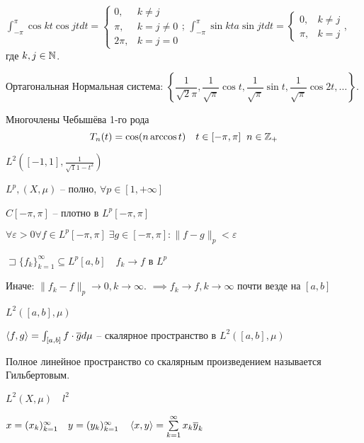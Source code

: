 $\int_{-\pi}^\pi \cos k t \cos jt dt = \begin{cases}
    0, & k\neq j\\
    \pi, & k = j \neq 0\\
    2\pi, & k =j = 0
\end{cases}$; $\int_{-\pi}^\pi \sin k t a\sin j t dt = \begin{cases}
    0, & k\neq j\\
    \pi, & k = j
\end{cases}$, где $k, j \in \mathbb{N}$.

Ортагональная Нормальная система: $\left\{ \dfrac{1}{\sqrt{2}\pi}, \dfrac{1}{\sqrt{\pi}}\cos t, \dfrac{1}{\sqrt{\pi}}\sin t,
\dfrac{1}{\sqrt{\pi}} \cos 2t, \dots
\right\}$.
\begin{definition}
    Многочлены Чебышёва 1-го рода
    \[T_n(t) = \cos(n \arccos t)\quad t\in [-\pi, \pi]\;\; n\in \mathbb{Z}_+\]

    $L^2([-1,1], \frac{1}{\sqrt{1}{1 - t^2}})$
\end{definition}

\begin{note}
    $L^p, (X, \mu)$ -- полно, $\forall p \in [1, +\infty ]$

    $C[-\pi, \pi]$ -- плотно в $L^p[-\pi, \pi]$

    $\forall \varepsilon >0 \forall f\in L^p[-\pi, \pi]\; \exists g\in [-\pi, \pi]: \|f - g\|_p <\varepsilon$
\end{note}

\begin{note}
    $\sqsupset \{f_k\}_{k=1}^{\infty } \subseteq L^p[a,b]\quad f_k \to f$ в $L^p$

    Иначе: $\|f_k - f\|_p \to 0, k\to \infty$. $\implies f_k \to f, k\to \infty $ почти везде на $[a,b]$
\end{note}

\begin{note}
    $L^2\left( [a,b], \mu \right) $

    $\left<f, g \right> = \int_{[a,b]}f \cdot \overline{g} d\mu$ -- скалярное пространство в $L^2([a,b], \mu)$
\end{note}

\begin{definition}
    Полное линейное пространство со скалярным произведением называется Гильбертовым.
\end{definition}

\begin{example}
    $L^2(X, \mu)\quad l^2$

    $x = (x_k)_{k=1}^{\infty }\quad y = (y_k)_{k=1}^{\infty }\quad \left<x,y \right> = \sum_{k=1}^{\infty }x_k \ov y_k$
\end{example}

